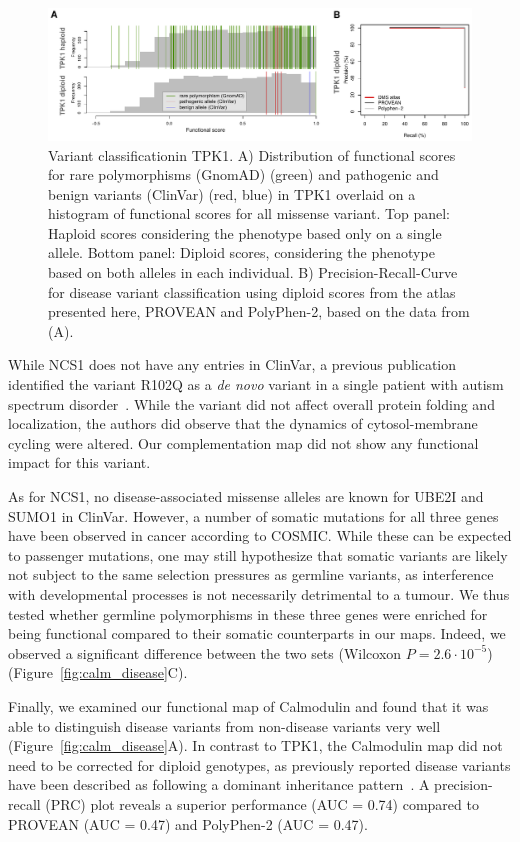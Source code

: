 \begin{figure}[h!]
	\centering
	\includegraphics[width=\textwidth]{img/diploid.pdf}
	\caption{Variant classificationin TPK1. A) Distribution of functional scores for rare polymorphisms (GnomAD) (green) and pathogenic and benign variants (ClinVar) (red, blue) in TPK1 overlaid on a histogram of functional scores for all missense variant. Top panel: Haploid scores considering the phenotype based only on a single allele. Bottom panel: Diploid scores, considering the phenotype based on both alleles in each individual. B) Precision-Recall-Curve for disease variant classification using diploid scores from the atlas presented here, PROVEAN and PolyPhen-2, based on the data from (A).}
	\label{fig:tpk1_diploid}
\end{figure}


While NCS1 does not have any entries in ClinVar, a previous publication identified the variant R102Q as a \textit{de novo} variant in a single patient with autism spectrum disorder~\cite{handley_structural_2010}. While the variant did not affect overall protein folding and localization, the authors did observe that the dynamics of cytosol-membrane cycling were altered. Our complementation map did not show any functional impact for this variant.

As for NCS1, no disease-associated missense alleles are known for UBE2I and SUMO1 in ClinVar. However, a number of somatic mutations for all three genes have been observed in cancer according to COSMIC. While these can be expected to passenger mutations, one may still hypothesize that somatic variants are likely not subject to the same selection pressures as germline variants, as interference with developmental processes is not necessarily detrimental to a tumour. We thus tested whether germline polymorphisms in these three genes were enriched for being functional compared to their somatic counterparts in our maps. Indeed, we observed a significant difference between the two sets (Wilcoxon $P = 2.6 \cdot 10^{-5}$) (Figure~\ref{fig:calm_disease}C).

Finally, we examined our functional map of Calmodulin and found that it was able to distinguish disease variants from non-disease variants very well (Figure~\ref{fig:calm_disease}A). In contrast to TPK1, the Calmodulin map did not need to be corrected for diploid genotypes, as previously reported disease variants have been described as following a dominant inheritance pattern~\cite{crotti_calmodulin_2013}. A precision-recall (PRC) plot reveals a superior performance (AUC = 0.74) compared to PROVEAN (AUC = 0.47) and PolyPhen-2 (AUC = 0.47).  


